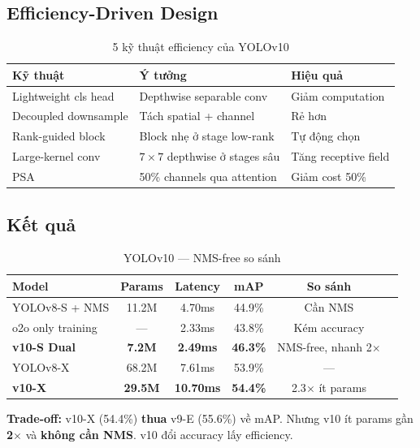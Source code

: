 \subsection{Efficiency-Driven Design}
\begin{table}[H]\centering
\caption{5 kỹ thuật efficiency của YOLOv10}
\begin{tabular}{lll}\toprule
\textbf{Kỹ thuật} & \textbf{Ý tưởng} & \textbf{Hiệu quả}\\\midrule
Lightweight cls head & Depthwise separable conv & Giảm computation \\
Decoupled downsample & Tách spatial + channel & Rẻ hơn \\
Rank-guided block & Block nhẹ ở stage low-rank & Tự động chọn \\
Large-kernel conv & $7\times7$ depthwise ở stages sâu & Tăng receptive field \\
PSA & 50\% channels qua attention & Giảm cost 50\% \\\bottomrule
\end{tabular}
\end{table}

\subsection{Kết quả}
\begin{table}[H]\centering
\caption{YOLOv10 --- NMS-free so sánh}
\begin{tabular}{lccccl}\toprule
\textbf{Model} & \textbf{Params} & \textbf{Latency} & \textbf{mAP} & \textbf{So sánh}\\\midrule
YOLOv8-S + NMS & 11.2M & 4.70ms & 44.9\% & Cần NMS \\
o2o only training & --- & 2.33ms & 43.8\% & Kém accuracy \\
\textbf{v10-S Dual} & \textbf{7.2M} & \textbf{2.49ms} & \textbf{46.3\%} & NMS-free, nhanh 2$\times$ \\\midrule
YOLOv8-X & 68.2M & 7.61ms & 53.9\% & --- \\
\textbf{v10-X} & \textbf{29.5M} & \textbf{10.70ms} & \textbf{54.4\%} & 2.3$\times$ ít params \\\bottomrule
\end{tabular}
\end{table}

\textbf{Trade-off:} v10-X (54.4\%) \textbf{thua} v9-E (55.6\%) về mAP. Nhưng v10 ít params gần \textbf{2$\times$} và \textbf{không cần NMS}. v10 đổi accuracy lấy efficiency.

